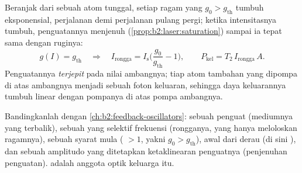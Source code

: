 \begin{proposition}\label{prop:b2:laser:steady}
Beranjak dari  sebuah atom tunggal, setiap ragam yang
$g_0 > g_{\text{th}}$ tumbuh eksponensial, perjalanan demi perjalanan
pulang pergi; ketika intensitasnya tumbuh, penguatannya menjenuh
(\cref{prop:b2:laser:saturation}) sampai ia tepat sama dengan ruginya:
\[
g(I) = g_{\text{th}} \quad\Longrightarrow\quad
I_{\text{rongga}} = I_{\text{s}}\Big(\frac{g_0}{g_{\text{th}}} - 1\Big),
\qquad P_{\text{kel}} = T_2\,I_{\text{rongga}}\,A .
\]
Penguatannya \emph{terjepit} pada nilai ambangnya; tiap atom tambahan
yang dipompa di atas ambangnya menjadi sebuah foton keluaran, sehingga daya keluarannya
tumbuh linear dengan pompanya di atas pompa ambangnya.
\end{proposition}

\begin{remark}\label{rem:b2:laser:feedback}
Bandingkanlah dengan 
\cref{ch:b2:feedback-oscillators}: sebuah penguat (mediumnya yang terbalik),
sebuah  yang selektif frekuensi (rongganya, yang hanya meloloskan ragamnya),
sebuah syarat mula ( $> 1$, yakni $g_0 > g_{\text{th}}$),
awal dari derau (di sini ), dan sebuah amplitudo yang ditetapkan
ketaklinearan penguatnya (penjenuhan penguatan).  adalah
anggota optik keluarga itu.
\end{remark}

